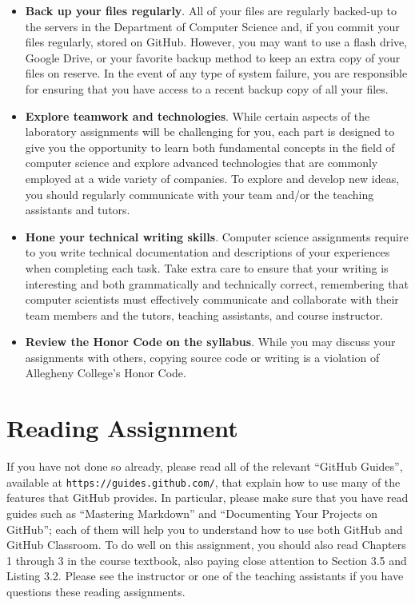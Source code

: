 \documentclass[11pt]{article}
\newcommand{\url}[1]{\lstinline{#1}}
\begin{document}
\begin{itemize}
\item {\bf Back up your files regularly}. All of your files are regularly backed-up to the servers in the Department of
  Computer Science and, if you commit your files regularly, stored on GitHub. However, you may want to use a flash
  drive, Google Drive, or your favorite backup method to keep an extra copy of your files on reserve. In the event of
  any type of system failure, you are responsible for ensuring that you have access to a recent backup copy of all your
  files.

\item {\bf Explore teamwork and technologies}. While certain aspects of the laboratory assignments will be challenging
  for you, each part is designed to give you the opportunity to learn both fundamental concepts in the field of computer
  science and explore advanced technologies that are commonly employed at a wide variety of companies. To explore and
  develop new ideas, you should regularly communicate with your team and/or the teaching assistants and tutors.

\item {\bf Hone your technical writing skills}. Computer science assignments require to you write technical
  documentation and descriptions of your experiences when completing each task. Take extra care to ensure that your
  writing is interesting and both grammatically and technically correct, remembering that computer scientists must
  effectively communicate and collaborate with their team members and the tutors, teaching assistants, and course
  instructor.

\item {\bf Review the Honor Code on the syllabus}. While you may discuss your assignments with others, copying source
  code or writing is a violation of Allegheny College's Honor Code.

\end{itemize}

\section*{Reading Assignment}

If you have not done so already, please read all of the relevant ``GitHub
Guides'', available at \url{https://guides.github.com/}, that explain how to use
many of the features that GitHub provides. In particular, please make sure that
you have read guides such as ``Mastering Markdown'' and ``Documenting Your
Projects on GitHub''; each of them will help you to understand how to use both
GitHub and GitHub Classroom. To do well on this assignment, you should also read
Chapters 1 through 3 in the course textbook, also paying close attention to
Section 3.5 and Listing 3.2. Please see the instructor or one of the teaching
assistants if you have questions these reading assignments.
\end{document}
